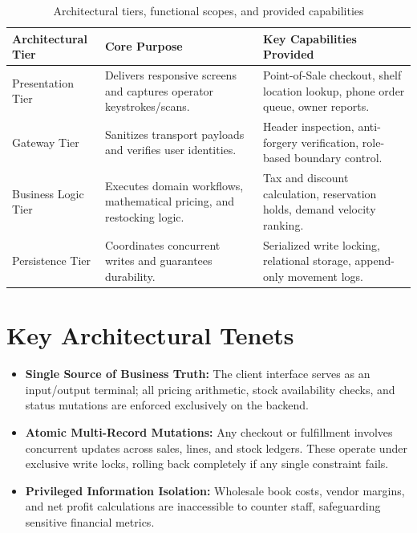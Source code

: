 \documentclass[12pt, a4paper]{report}
\begin{document}
\begin{table}[H]
\centering
\footnotesize
\begin{tabularx}{\textwidth}{L{3.5cm} L{6.0cm} L{5.9cm}}
\toprule
\textbf{Architectural Tier} & \textbf{Core Purpose} & \textbf{Key Capabilities Provided} \\
\midrule
Presentation Tier & Delivers responsive screens and captures operator keystrokes/scans. & Point-of-Sale checkout, shelf location lookup, phone order queue, owner reports. \\
Gateway Tier & Sanitizes transport payloads and verifies user identities. & Header inspection, anti-forgery verification, role-based boundary control. \\
Business Logic Tier & Executes domain workflows, mathematical pricing, and restocking logic. & Tax and discount calculation, reservation holds, demand velocity ranking. \\
Persistence Tier & Coordinates concurrent writes and guarantees durability. & Serialized write locking, relational storage, append-only movement logs. \\
\bottomrule
\end{tabularx}
\caption{Architectural tiers, functional scopes, and provided capabilities}
\label{tab:layers}
\end{table}

\section{Key Architectural Tenets}
\begin{itemize}[leftmargin=1.5em]
  \item \textbf{Single Source of Business Truth:} The client interface serves as an input/output terminal; all pricing arithmetic, stock availability checks, and status mutations are enforced exclusively on the backend.
  \item \textbf{Atomic Multi-Record Mutations:} Any checkout or fulfillment involves concurrent updates across sales, lines, and stock ledgers. These operate under exclusive write locks, rolling back completely if any single constraint fails.
  \item \textbf{Privileged Information Isolation:} Wholesale book costs, vendor margins, and net profit calculations are inaccessible to counter staff, safeguarding sensitive financial metrics.
\end{itemize}

\end{document}
